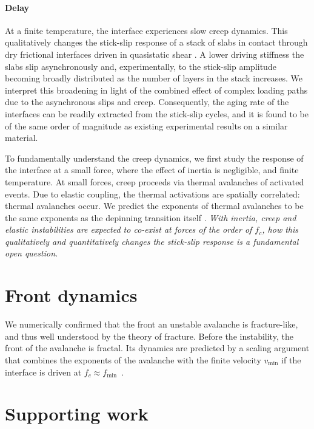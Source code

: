 \documentclass{goose-article}
\begin{document}
\paragraph{Delay}

At a finite temperature, the interface experiences slow creep dynamics.
This qualitatively changes the stick-slip response of a stack of slabs in contact through dry frictional interfaces driven in quasistatic shear \cite{Poincloux2023}.
A lower driving stiffness the slabs slip asynchronously and, experimentally, to the stick-slip amplitude becoming broadly distributed as the number of layers in the stack increases.
We interpret this broadening in light of the combined effect of complex loading paths due to the asynchronous slips and creep.
Consequently, the aging rate of the interfaces can be readily extracted from the stick-slip cycles, and it is found to be of the same order of magnitude as existing experimental results on a similar material.

To fundamentally understand the creep dynamics, we first study the response of the interface at a small force, where the effect of inertia is negligible, and finite temperature.
At small forces, creep proceeds via thermal avalanches of activated events.
Due to elastic coupling, the thermal activations are spatially correlated: thermal avalanches occur.
We predict the exponents of thermal avalanches to be the same exponents as the depinning transition itself \cite{deGeus2024}.
\emph{With inertia, creep and elastic instabilities are expected to co-exist at forces of the order of $f_c$, how this qualitatively and quantitatively changes the stick-slip response is a fundamental open question.}

\section{Front dynamics}

We numerically confirmed that the front an unstable avalanche is fracture-like, and thus well understood by the theory of fracture.
Before the instability, the front of the avalanche is fractal.
Its dynamics are predicted by a scaling argument that combines the exponents of the avalanche with the finite velocity $v_{\min}$ if the interface is driven at $f_c \approx f_{\min}$~\cite{deGeus2022}.

\section{Supporting work}
\end{document}
